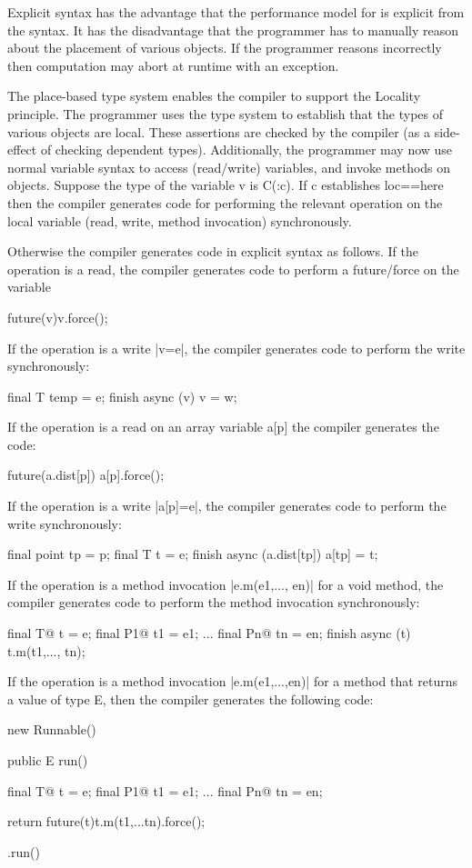 Explicit syntax has the advantage that the performance model for \Xten{}
is explicit from the syntax. It has the disadvantage that the
programmer has to manually reason about the placement of various
objects. If the programmer reasons incorrectly then computation may
abort at runtime with an exception.

The place-based type system enables the compiler to support the
Locality principle. The programmer uses the type system to establish
that the types of various objects are local. These assertions are
checked by the compiler (as a side-effect of checking dependent
types). Additionally, the programmer may now use normal variable
syntax to access (read/write) variables, and invoke methods on
objects. Suppose the type of the variable v is C(:c). If c establishes
loc==here then the compiler generates code for performing the relevant
operation on the local variable (read, write, method invocation)
synchronously. 

Otherwise the compiler generates code in explicit syntax as
follows. If the operation is a read, the compiler generates code to
perform a future/force on the variable

\begin{x10}
  future(v){v}.force();  
\end{x10}

If the operation is a write |v=e|, the compiler generates code to perform
the write synchronously:

\begin{x10}
  final T temp = e;
  finish async (v){ v = w;}
\end{x10}

If the operation is a read on an array variable a[p] the compiler
generates the code:

\begin{x10}
  future(a.dist[p]){ a[p]}.force();  
\end{x10}


If the operation is a write |a[p]=e|, the compiler generates code to perform
the write synchronously:

\begin{x10}
  final point tp = p;
  final T t = e;
  finish async (a.dist[tp]){ a[tp] = t;}
\end{x10}

If the operation is a method invocation |e.m(e1,..., en)| for a void
method, the compiler generates code to perform the method invocation
synchronously:

\begin{x10}
  final T@ t = e;
  final P1@ t1 = e1;
  ...
  final Pn@ tn = en;
  finish async (t){ 
    t.m(t1,..., tn);
  }  
\end{x10}


If the operation is a method invocation |e.m(e1,...,en)| for a method
that returns a value of type E, then the compiler generates the
following code:

\begin{x10}
  new Runnable() {
  public E run() {
    final T@ t = e;
    final P1@ t1 = e1;
    ...
    final Pn@ tn = en;
  
    return future(t){t.m(t1,...tn)}.force();
  }}.run()
\end{x10}

